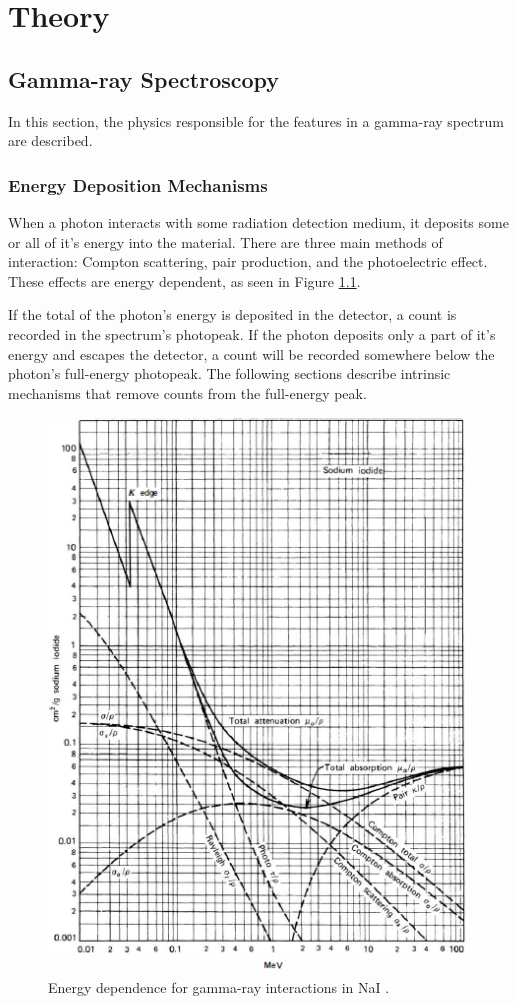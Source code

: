 \chapter{Theory}

\section{Gamma-ray Spectroscopy}

In this section, the physics responsible for the features in a gamma-ray spectrum are described. 

\subsection{Energy Deposition Mechanisms}

When a photon interacts with some radiation detection medium, it deposits some or all of it's energy into the material. There are three main methods of interaction: Compton scattering, pair production, and the photoelectric effect. These effects are energy dependent, as seen in Figure \ref{fig:energy_dependence_interactions}.

If the total of the photon's energy is deposited in the detector, a count is recorded in the spectrum's photopeak. If the photon deposits only a part of it's energy and escapes the detector, a count will be recorded somewhere below the photon's full-energy photopeak.  The following sections describe intrinsic mechanisms that remove counts from the full-energy peak.%



\begin{figure}[H]
\centering
\includegraphics[width=0.75\linewidth]{images/energy_dependence_interactions}
\caption{Energy dependence for gamma-ray interactions in NaI \cite{knoll}.}
\label{fig:energy_dependence_interactions}
\end{figure}

